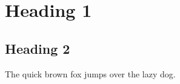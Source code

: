\documentclass{article}
\begin{document}
\section{Heading 1}
\subsection{Heading 2}
The quick brown fox jumps over the lazy dog.
\end{document}
